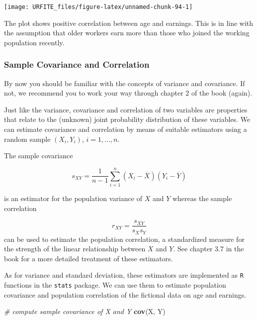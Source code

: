\documentclass[]{book}
\newenvironment{Shaded}{\begin{snugshade}}{\end{snugshade}}
\newcommand{\KeywordTok}[1]{\textcolor[rgb]{0.13,0.29,0.53}{\textbf{#1}}}
\newcommand{\CommentTok}[1]{\textcolor[rgb]{0.56,0.35,0.01}{\textit{#1}}}
\newcommand{\NormalTok}[1]{#1}
\theoremstyle{definition}
\theoremstyle{definition}
\theoremstyle{definition}
\theoremstyle{remark}
\begin{document}
\begin{center}\texttt{[image: URFITE\_files/figure-latex/unnamed-chunk-94-1]} \end{center}

The plot shows positive correlation between age and earnings. This is in
line with the assumption that older workers earn more than those who
joined the working population recently.

\subsubsection*{Sample Covariance and
Correlation}\label{sample-covariance-and-correlation}

By now you should be familiar with the concepts of variance and
covariance. If not, we recommend you to work your way through chapter 2
of the book (again).

Just like the variance, covariance and correlation of two variables are
properties that relate to the (unknown) joint probability distribution
of these variables. We can estimate covariance and correlation by means
of suitable estimators using a random sample \((X_i,Y_i)\),
\(i=1,\dots,n\).

The sample covariance

\[ s_{XY} = \frac{1}{n-1} \sum_{i=1}^n (X_i - \overline{X})(Y_i - \overline{Y}) \]

is an estimator for the population variance of \(X\) and \(Y\) whereas
the sample correlation

\[ r_{XY} = \frac{s_{XY}}{s_Xs_Y} \] can be used to estimate the
population correlation, a standardized measure for the strength of the
linear relationship between \(X\) and \(Y\). See chapter 3.7 in the book
for a more detailed treatment of these estimators.

As for variance and standard deviation, these estimators are implemented
as \texttt{R} functions in the \texttt{stats} package. We can use them
to estimate population covariance and population correlation of the
fictional data on age and earnings.

\begin{Shaded}
\begin{Highlighting}[]
\CommentTok{# compute sample covariance of X and Y}
\KeywordTok{cov}\NormalTok{(X, Y)}
\end{Highlighting}
\end{Shaded}
\end{document}
